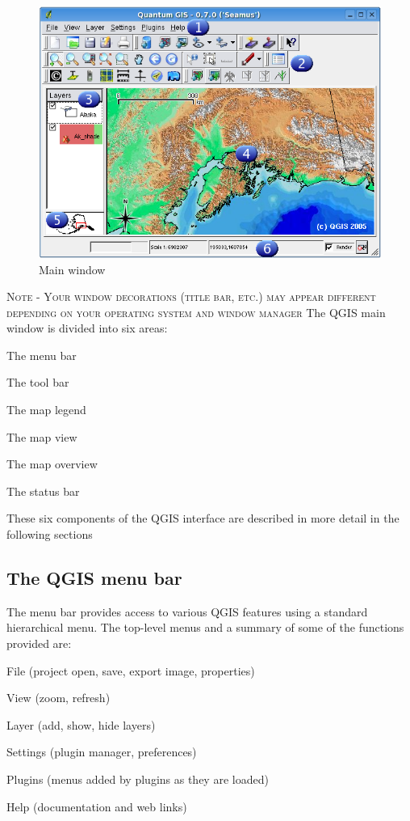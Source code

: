 \begin{figure}[h]
   \begin{center}
   \caption{Main window}\label{fig:startup}
   \includegraphics[scale=.7]{qgis_user_guide_images/startup}
\end{center}  
   
\end{figure}
\textsc{Note - Your window decorations (title bar, etc.) may appear different depending on your operating system and window manager}
The QGIS main window is divided into six areas:
\begin{compactenum}
\item The menu bar
\item The tool bar
\item The map legend
\item The map view
\item The map overview
\item The status bar
\end{compactenum}

These six components of the QGIS interface are described in more detail in the
following sections 
\subsection{The QGIS menu bar}
The menu bar provides access to various QGIS features using a standard 
hierarchical menu. The top-level menus and a summary of some of the functions provided are:
\begin{compactitem}
\item File (project open, save, export image, properties)
\item View (zoom, refresh)
\item Layer (add, show, hide layers)
\item Settings (plugin manager, preferences)
\item Plugins (menus added by plugins as they are loaded)
\item Help (documentation and web links)
\end{compactitem}

